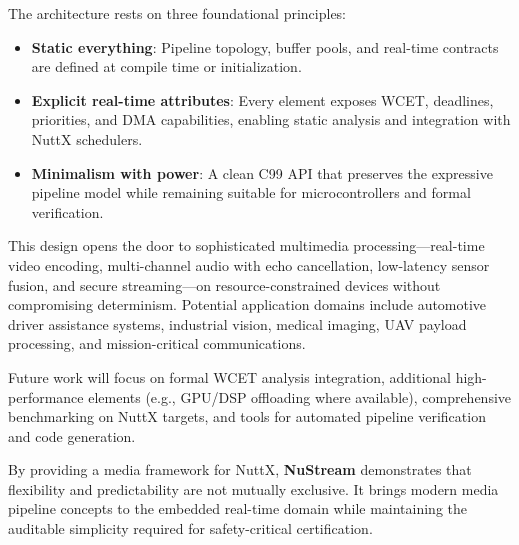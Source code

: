 \documentclass{article}
\begin{document}
The architecture rests on three foundational principles:
\begin{itemize}
    \item \textbf{Static everything}: Pipeline topology, buffer pools, and real-time contracts are defined at compile time or initialization.
    \item \textbf{Explicit real-time attributes}: Every element exposes WCET, deadlines, priorities, and DMA capabilities, enabling static analysis and integration with NuttX schedulers.
    \item \textbf{Minimalism with power}: A clean C99 API that preserves the expressive pipeline model while remaining suitable for microcontrollers and formal verification.
\end{itemize}

This design opens the door to sophisticated multimedia processing—real-time video encoding, multi-channel audio with echo cancellation,
low-latency sensor fusion, and secure streaming—on resource-constrained devices without compromising determinism. Potential application
domains include automotive driver assistance systems, industrial vision, medical imaging, UAV payload processing, and mission-critical communications.

Future work will focus on formal WCET analysis integration, additional high-performance elements (e.g., GPU/DSP offloading where available),
comprehensive benchmarking on NuttX targets, and tools for automated pipeline verification and code generation.

By providing a media framework for NuttX, \textbf{NuStream} demonstrates that flexibility and predictability are not mutually exclusive.
It brings modern media pipeline concepts to the embedded real-time domain while maintaining the auditable simplicity required
for safety-critical certification.
\end{document}
